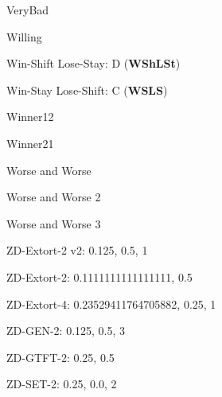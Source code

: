 \item VeryBad~\cite{Andre2013}
\item Willing \cite{Van2015}
\item Win-Shift Lose-Stay: D (\textbf{WShLSt})~\cite{Li2011}
\item Win-Stay Lose-Shift: C (\textbf{WSLS})~\cite{Kraines1989, Nowak1993, Stewart2012}
\item Winner12~\cite{mathieu2017}
\item Winner21~\cite{mathieu2017}
\item Worse and Worse\cite{prison}
\item Worse and Worse 2\cite{prison}
\item Worse and Worse 3\cite{prison}
\item ZD-Extort-2 v2: 0.125, 0.5, 1 \cite{Kuhn2017}
\item ZD-Extort-2: 0.1111111111111111, 0.5 \cite{Stewart2012}
\item ZD-Extort-4: 0.23529411764705882, 0.25, 1 \cite{axelrodproject}
\item ZD-GEN-2: 0.125, 0.5, 3 \cite{Kuhn2017}
\item ZD-GTFT-2: 0.25, 0.5 \cite{Stewart2012}
\item ZD-SET-2: 0.25, 0.0, 2 \cite{Kuhn2017}